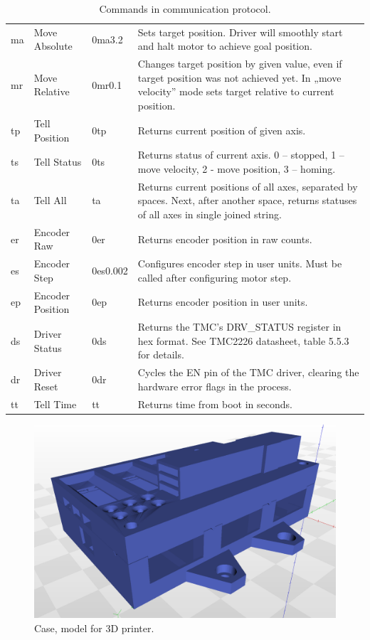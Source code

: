 \documentclass[10pt,article]{article}
\begin{document}
\begin{table}[ht]
\begin{tabularx}{\textwidth}{lllX}
\rowcolor[gray]{0.90} ma & Move Absolute & 0ma3.2 & Sets target position. Driver will smoothly start and halt motor to achieve goal position. \\
\rowcolor[gray]{0.95} mr & Move Relative & 0mr0.1 & Changes target position by given value, even if target position was not achieved yet. In „move velocity” mode sets target relative to current position. \\
\rowcolor[gray]{0.90} tp & Tell Position & 0tp & Returns current position of given axis. \\
\rowcolor[gray]{0.95} ts & Tell Status & 0ts & Returns status of current axis. 0 – stopped, 1 – move velocity, 2 - move position, 3 – homing. \\
\rowcolor[gray]{0.90} ta & Tell All & ta & Returns current positions of all axes, separated by spaces. Next, after another space, returns statuses of all axes in single joined string.\\
\rowcolor[gray]{0.95} er & Encoder Raw & 0er & Returns encoder position in raw counts.\\
\rowcolor[gray]{0.90} es & Encoder Step & 0es0.002 & Configures encoder step in user units. Must be called after configuring motor step.\\
\rowcolor[gray]{0.95} ep & Encoder Position & 0ep & Returns encoder position in user units. \\
\rowcolor[gray]{0.90} ds & Driver Status & 0ds & Returns the TMC's DRV\_STATUS register in hex format. See TMC2226 datasheet, table 5.5.3 for details. \\
\rowcolor[gray]{0.95} dr & Driver Reset & 0dr & Cycles the EN pin of the TMC driver, clearing the hardware error flags in the process. \\
\rowcolor[gray]{0.90} tt & Tell Time & tt & Returns time from boot in seconds. \\
\end{tabularx}
\caption{Commands in communication protocol.}\label{commands}
\end{table}

\begin{figure}[H]
 \centering
 \includegraphics[width = 15cm]{case.png}
\caption {Case, model for 3D printer.} \label{case}
\end{figure}
\end{document}
